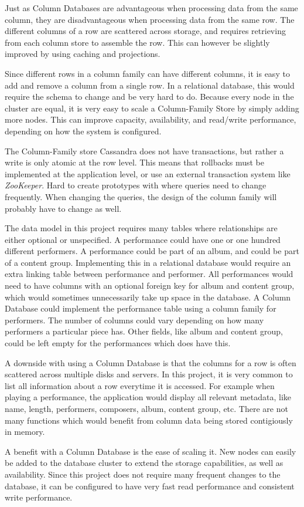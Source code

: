 Just as Column Databases are advantageous when processing data from the same column, they are disadvantageous when processing data from the same row. The different columns of a row are scattered across storage, and requires retrieving from each column store to assemble the row. This can however be slightly improved by using caching and projections.

Since different rows in a column family can have different columns, it is easy to add and remove a column from a single row. In a relational database, this would require the schema to change and be very hard to do.
Because every node in the cluster are equal, it is very easy to scale a Column-Family Store by simply adding more nodes. This can improve capacity, availability, and read/write performance, depending on how the system is configured.

The Column-Family store Cassandra does not have transactions, but rather a write is only atomic at the row level. This means that rollbacks must be implemented at the application level, or use an external transaction system like \emph{ZooKeeper}.
Hard to create prototypes with where queries need to change frequently. When changing the queries, the design of the column family will probably have to change as well.

The data model in this project requires many tables where relationships are either optional or unspecified. A performance could have one or one hundred different performers. A performance could be part of an album, and could be part of a content group. Implementing this in a relational database would require an extra linking table between performance and performer. All performances would need to have columns with an optional foreign key for album and content group, which would sometimes unnecessarily take up space in the database. A Column Database could implement the performance table using a column family for performers. The number of columns could vary depending on how many performers a particular piece has. Other fields, like album and content group, could be left empty for the performances which does have this.

A downside with using a Column Database is that the columns for a row is often scattered across multiple disks and servers. In this project, it is very common to list all information about a row everytime it is accessed. For example when playing a performance, the application would display all relevant metadata, like name, length, performers, composers, album, content group, etc. There are not many functions which would benefit from column data being stored contigiously in memory.

A benefit with a Column Database is the ease of scaling it. New nodes can easily be added to the database cluster to extend the storage capabilities, as well as availability. Since this project does not require many frequent changes to the database, it can be configured to have very fast read performance and consistent write performance.
